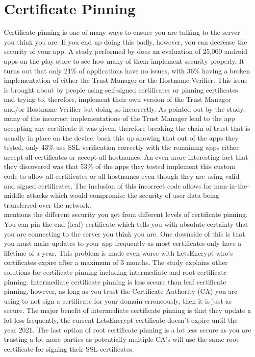 \section{Certificate Pinning}
Certificate pinning is one of many ways to ensure you are talking to the server you think you are. If you end up doing this badly, however, you can decrease the security of your app. A study performed by \cite{Buhov2016} does an evaluation of 25,000 android apps on the play store to see how many of them implement security properly. It turns out that only 21\% of applications have no issues, with 36\% having a broken implementation of either the Trust Manager or the Hostname Verifier. This issue is brought about by people using self-signed certificates or pinning certificates and trying to, therefore, implement their own version of the Trust Manager and/or Hostname Verifier but doing so incorrectly. As pointed out by the study, many of the incorrect implementations of the Trust Manager lead to the app accepting any certificate it was given, therefore breaking the chain of trust that is usually in place on the device. \cite{Tendulkar2014} back this up showing that out of the apps they tested, only 43\% use SSL verification correctly with the remaining apps either accept all certificates or accept all hostnames. An even more interesting fact that they discovered was that 53\% of the apps they tested implement this custom code to allow all certificates or all hostnames even though they are using valid and signed certificates. The inclusion of this incorrect code allows for man-in-the-middle attacks which would compromise the security of user data being transferred over the network.
\\
\indent\cite{Buhov2016} mentions the different security you get from different levels of certificate pinning. You can pin the end (leaf) certificate which tells you with absolute certainty that you are connecting to the server you think you are. One downside of this is that you must make updates to your app frequently as most certificates only have a lifetime of a year. This problem is made even worse with LetsEncrypt who's certificates expire after a maximum of 3 months. The study explains other solutions for certificate pinning including intermediate and root certificate pinning. Intermediate certificate pinning is less secure than leaf certificate pinning, however, as long as you trust the Certificate Authority (CA) you are using to not sign a certificate for your domain erroneously, then it is just as secure. The major benefit of intermediate certificate pinning is that they update a lot less frequently, the current LetsEncrypt certificate doesn't expire until the year 2021. The last option of root certificate pinning is a lot less secure as you are trusting a lot more parties as potentially multiple CA's will use the same root certificate for signing their SSL certificates.
